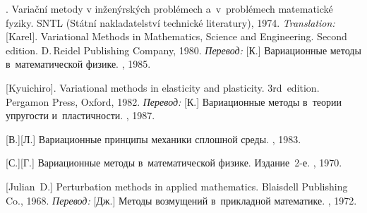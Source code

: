 \begin{thebibliography}{123}
\begin{otherlanguage}{russian}


. Varia\v{c}ní metody v in\v{z}en\'{y}rsk\'{y}ch probl\'{e}mech a~v~pro\-bl\'{e}\-mech matematick\'{e} fyziky. SNTL (St\'{a}tní nakladatelství technick\'{e} literatury), 1974. 
\emph{Translation:}
[Karel]. Variational Methods in Mathematics, Science and Engineering. Second edition. D.\,Reidel Publishing Company, 1980. 
\emph{Перевод:}
[К.] Вариационные методы в~математической физике. \mirpublisher, 1985. 

[Kyuichiro]. Variational methods in elasticity and plasticity. 3rd~edition. Pergamon Press, Oxford, 1982. 
\emph{Перевод:} [К.] Вариационные методы в~теории упругости и~пластичности. \mirpublisher, 1987. 

[В.][Л.] Вариационные принципы механики сплошной среды. \naukapublisher, 1983. 

[С.][Г.] Вариационные методы в~математической физике. Издание~2\hbox{-}е. \naukapublisher, 1970. 

%
%



[Julian~D.] Perturbation methods in applied mathematics. Blaisdell Publishing Co., 1968. 
\emph{Перевод:} [Дж.] Методы возмущений в~прикладной математике. \mirpublisher, 1972. 


\end{otherlanguage}
\end{thebibliography}
